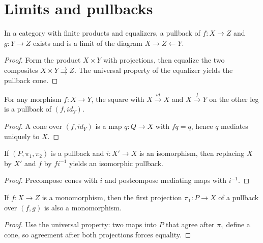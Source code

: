 
\section{Limits and pullbacks}

\begin{theorem}
In a category with finite products and equalizers, a pullback of $f : X \to Z$ and $g : Y \to Z$ exists and is a limit of the diagram $X \to Z \leftarrow Y$.
\end{theorem}

\begin{proof}
Form the product $X \times Y$ with projections, then equalize the two composites $X \times Y \rightrightarrows Z$. The universal property of the equalizer yields the pullback cone.
\end{proof}

\begin{lemma}
For any morphism $f : X \to Y$, the square with $X \xrightarrow{id} X$ and $X \xrightarrow{f} Y$ on the other leg is a pullback of $(f, id_Y)$.
\end{lemma}

\begin{proof}
A cone over $(f, id_Y)$ is a map $q : Q \to X$ with $f q = q$, hence $q$ mediates uniquely to $X$.
\end{proof}

\begin{proposition}
If $(P, \pi_1, \pi_2)$ is a pullback and $i : X' \to X$ is an isomorphism, then replacing $X$ by $X'$ and $f$ by $f i^{-1}$ yields an isomorphic pullback.
\end{proposition}

\begin{proof}
Precompose cones with $i$ and postcompose mediating maps with $i^{-1}$.
\end{proof}

\begin{corollary}
If $f : X \to Z$ is a monomorphism, then the first projection $\pi_1 : P \to X$ of a pullback over $(f, g)$ is also a monomorphism.
\end{corollary}

\begin{proof}
Use the universal property: two maps into $P$ that agree after $\pi_1$ define a cone, so agreement after both projections forces equality.
\end{proof}

